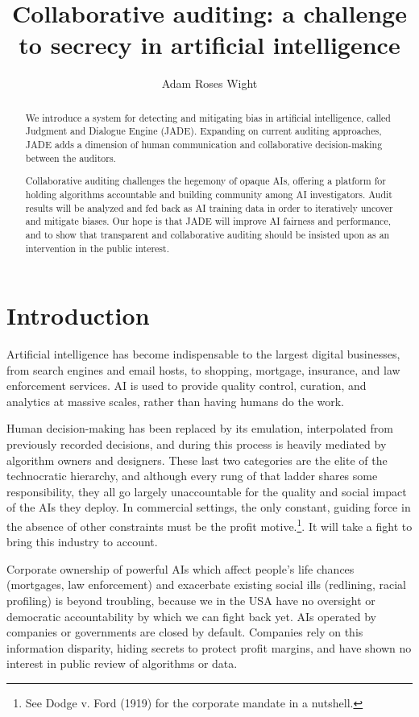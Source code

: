 \documentclass[format=sigconf]{acmart}
\title{Collaborative auditing: a challenge to secrecy in artificial intelligence}
\author{Adam Roses Wight}
\affiliation{Wikimedia Foundation}
\begin{document}
\begin{abstract}
We introduce a system for detecting and mitigating bias in artificial intelligence, called Judgment and Dialogue Engine (JADE).  Expanding on current auditing approaches, JADE adds a dimension of human communication and collaborative decision-making between the auditors.

Collaborative auditing challenges the hegemony of opaque AIs, offering a platform for holding algorithms accountable and building community among AI investigators.  Audit results will be analyzed and fed back as AI training data in order to iteratively uncover and mitigate biases.  Our hope is that JADE will improve AI fairness and performance, and to show that transparent and collaborative auditing should be insisted upon as an intervention in the public interest.
\end{abstract}

\maketitle

\section{Introduction}

Artificial intelligence has become indispensable to the largest digital businesses, from search engines and email hosts, to shopping, mortgage, insurance, and law enforcement services.  AI is used to provide quality control, curation, and analytics at massive scales, rather than having humans do the work.

Human decision-making has been replaced by its emulation, interpolated from previously recorded decisions, and during this process is heavily mediated by algorithm owners and designers.  These last two categories are the elite of the technocratic hierarchy, and although every rung of that ladder shares some responsibility, they all go largely unaccountable for the quality and social impact of the AIs they deploy.  In commercial settings, the only constant, guiding force in the absence of other constraints must be the profit motive.\footnote{See Dodge v. Ford (1919) for the corporate mandate in a nutshell.}. It will take a fight to bring this industry to account.

Corporate ownership of powerful AIs which affect people's life chances (mortgages, law enforcement) and exacerbate existing social ills (redlining, racial profiling) is beyond troubling, because we in the USA have no oversight or democratic accountability by which we can fight back yet.  AIs operated by companies or governments are closed by default.  Companies rely on this information disparity, hiding secrets to protect profit margins, and have shown no interest in public review of algorithms or data.
\end{document}
